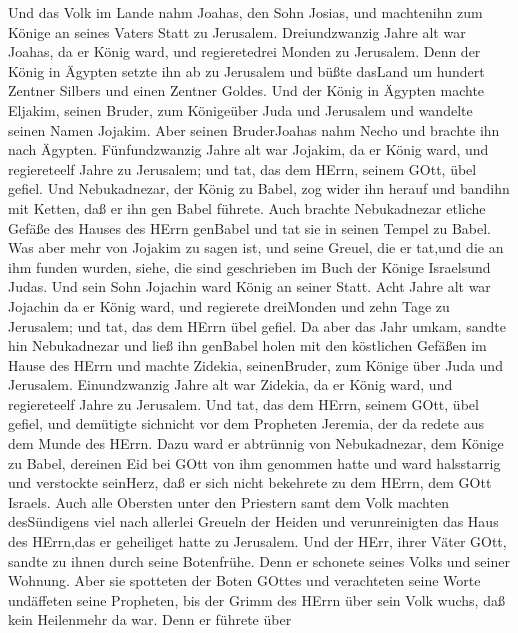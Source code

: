  Und das Volk im Lande nahm Joahas, den Sohn Josias, und
machtenihn zum Könige an seines Vaters Statt zu Jerusalem. 
Dreiundzwanzig Jahre alt war Joahas, da er König ward, und regieretedrei
Monden zu Jerusalem.  Denn der König in Ägypten setzte ihn
ab zu Jerusalem und büßte dasLand um hundert Zentner Silbers und einen
Zentner Goldes.  Und der König in Ägypten machte Eljakim,
seinen Bruder, zum Königeüber Juda und Jerusalem und wandelte seinen
Namen Jojakim. Aber seinen BruderJoahas nahm Necho und brachte ihn nach
Ägypten.  Fünfundzwanzig Jahre alt war Jojakim, da er König
ward, und regiereteelf Jahre zu Jerusalem; und tat, das dem HErrn,
seinem GOtt, übel gefiel.  Und Nebukadnezar, der König zu
Babel, zog wider ihn herauf und bandihn mit Ketten, daß er ihn gen Babel
führete.  Auch brachte Nebukadnezar etliche Gefäße des
Hauses des HErrn genBabel und tat sie in seinen Tempel zu Babel.
 Was aber mehr von Jojakim zu sagen ist, und seine Greuel,
die er tat,und die an ihm funden wurden, siehe, die sind geschrieben im
Buch der Könige Israelsund Judas. Und sein Sohn Jojachin ward König an
seiner Statt.  Acht Jahre alt war Jojachin da er König ward,
und regierete dreiMonden und zehn Tage zu Jerusalem; und tat, das dem
HErrn übel gefiel.  Da aber das Jahr umkam, sandte hin
Nebukadnezar und ließ ihn genBabel holen mit den köstlichen Gefäßen im
Hause des HErrn und machte Zidekia, seinenBruder, zum Könige über Juda
und Jerusalem.  Einundzwanzig Jahre alt war Zidekia, da er
König ward, und regiereteelf Jahre zu Jerusalem.  Und tat,
das dem HErrn, seinem GOtt, übel gefiel, und demütigte sichnicht vor dem
Propheten Jeremia, der da redete aus dem Munde des HErrn. 
Dazu ward er abtrünnig von Nebukadnezar, dem Könige zu Babel, dereinen
Eid bei GOtt von ihm genommen hatte und ward halsstarrig und verstockte
seinHerz, daß er sich nicht bekehrete zu dem HErrn, dem GOtt Israels.
 Auch alle Obersten unter den Priestern samt dem Volk
machten desSündigens viel nach allerlei Greueln der Heiden und
verunreinigten das Haus des HErrn,das er geheiliget hatte zu Jerusalem.
 Und der HErr, ihrer Väter GOtt, sandte zu ihnen durch
seine Botenfrühe. Denn er schonete seines Volks und seiner Wohnung.
 Aber sie spotteten der Boten GOttes und verachteten seine
Worte undäffeten seine Propheten, bis der Grimm des HErrn über sein Volk
wuchs, daß kein Heilenmehr da war.  Denn er führete über
